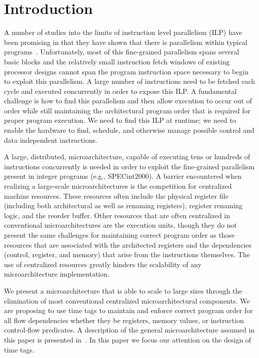 \documentclass[10pt,twocolumn,dvips]{article}
\begin{document}
\section{Introduction}
\vspace{-0.1in}
A number of studies into the limits of instruction level parallelism (ILP) have
been promising in that they have shown that there is parallelism within
typical programs~\cite{Gon97,Lam92,Uht95}.  
Unfortunately, most of this fine-grained
parallelism spans several basic blocks and the relatively small
instruction fetch windows of existing processor designs cannot span
the program instruction space necessary to begin to exploit this
parallelism.  A large number of instructions need to be fetched
each cycle and executed concurrently in order to expose this ILP.
A fundamental challenge 
is how to find this parallelism and then allow execution to occur
out of order  
while still maintaining the architectural program order that
is required for proper program execution.
We need to find this ILP at runtime; we need to 
enable the hardware to find, schedule,
and otherwise manage possible control and data independent instructions.

A large, distributed, microarchitecture, capable of executing tens or
hundreds of instructions concurrently
is needed in order to exploit the fine-grained parallelism present 
in integer programs (e.g., SPECint2000).
A barrier encountered when realizing a large-scale microarchitectures is the
competition for centralized machine resources.
These resources often include the 
physical register file (including both architectural as well as renaming 
registers), register renaming logic,
and the reorder buffer.  Other resources that are often centralized
in conventional microarchitectures are the execution units, though they
do not present the same challenges for maintaining correct program order
as those resources that are associated with the architected registers
and the dependencies (control, register, and memory) that arise
from the instructions themselves.  The use of centralized resources
greatly hinders the scalability of any microarchitecture implementation. 

We present a microarchitecture that is able to scale to large sizes
through the
elimination of most conventional centralized microarchitectural components.
We are proposing to use time tags to maintain 
and enforce correct program order for all flow dependencies whether
they be registers, memory values, or instruction control-flow predicates.
A description of the general microarchitecture
assumed in this paper is presented in~\cite{Uht01}.  In this paper
we focus our attention on the design of time tags.
\end{document}

